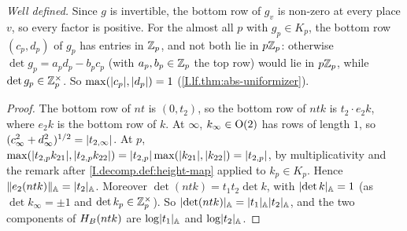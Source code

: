 \begin{definition}
\end{definition}
\noindent\emph{Well defined.} Since $g$ is invertible, the bottom row of $g_v$ is non-zero at every place $v$, so every
factor is positive. For the almost all $p$ with $g_p\in K_p$, the bottom row $(c_p,d_p)$ of $g_p$ has entries in $\mathbb{Z}_p$,
and not both lie in $p\mathbb{Z}_p$: otherwise $\det g_p=a_pd_p-b_pc_p$ (with $a_p,b_p\in\mathbb{Z}_p$ the top row) would lie in
$p\mathbb{Z}_p$, while $\det g_p\in\mathbb{Z}_p^\times$. So
$\max(\lvert c_p\rvert,\lvert d_p\rvert)=1$ (\cref{I.lf.thm:abs-uniformizer}).

\begin{theorem}
\end{theorem}
\begin{proof}
The bottom row of $nt$ is $(0,t_2)$, so the bottom row of $ntk$ is $t_2\cdot e_2k$, where $e_2k$ is the bottom row of $k$.
At $\infty$, $k_\infty\in\mathrm{O}(2)$ has rows of length $1$, so $(c_\infty^2+d_\infty^2)^{1/2}=\lvert t_{2,\infty}\rvert$. At $p$,
$\max(\lvert t_{2,p}k_{21}\rvert,\lvert t_{2,p}k_{22}\rvert)=\lvert t_{2,p}\rvert\max(\lvert k_{21}\rvert,\lvert k_{22}\rvert)=\lvert t_{2,p}\rvert$, by
multiplicativity and the remark after \cref{I.decomp.def:height-map} applied to $k_p\in K_p$. Hence
$\lVert e_2(ntk)\rVert_{\mathbb{A}}=\lvert t_2\rvert_{\mathbb{A}}$. Moreover $\det(ntk)=t_1t_2\det k$, with $\lvert\det k\rvert_{\mathbb{A}}=1$ (as $\det k_\infty=\pm1$ and
$\det k_p\in\mathbb{Z}_p^\times$). So $\lvert\det(ntk)\rvert_{\mathbb{A}}=\lvert t_1\rvert_{\mathbb{A}}\lvert t_2\rvert_{\mathbb{A}}$, and the two components of $H_B(ntk)$ are
$\log\lvert t_1\rvert_{\mathbb{A}}$ and $\log\lvert t_2\rvert_{\mathbb{A}}$.
\end{proof}

